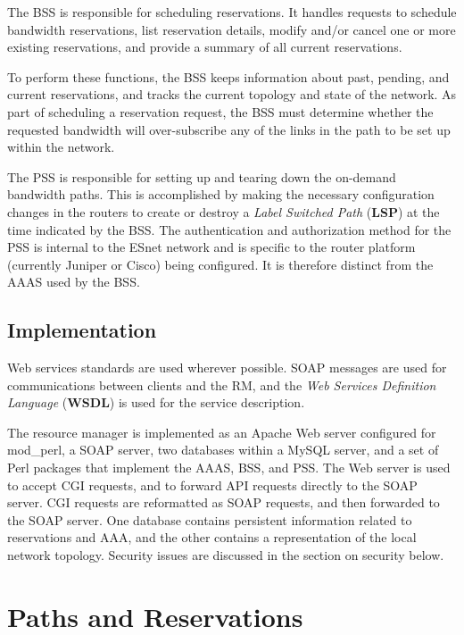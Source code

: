 \documentclass[conference]{IEEEtran}
\begin{document}
The BSS is responsible for scheduling reservations.  It handles
requests to schedule bandwidth reservations, list reservation details,
modify and/or cancel one or more existing reservations, and provide a summary
of all current reservations.

To perform these functions, the BSS keeps information about past,
pending, and current reservations, and tracks the current topology and state of
the network.  As part of scheduling a reservation request, the BSS must
determine whether the requested bandwidth will over-subscribe any of the links
in the path to be set up within the network.

The PSS is responsible for setting up and tearing down the on-demand bandwidth 
paths. This is accomplished by making the necessary configuration changes in 
the routers to create or destroy a \emph{Label Switched Path }(\textbf{LSP}) at the time
indicated by the BSS. The authentication and authorization method for the PSS 
is internal to the ESnet network and is specific to the router platform 
(currently Juniper or Cisco) being configured.  It is therefore distinct from 
the AAAS used by the BSS.

\subsection{Implementation}

Web services standards are used wherever possible.  SOAP \cite{SOAP} messages are
used for communications between clients and the RM, and 
the \emph{Web Services Definition Language} (\textbf{WSDL}) \cite{WSDL} is used for the service description.
 
The resource manager is implemented as an Apache Web server configured for
mod\_perl, a SOAP server, two databases within a MySQL server, and a set of 
Perl packages that implement the AAAS, BSS, and PSS.  The Web server is
used to accept CGI requests, and to forward API requests directly to the SOAP 
server.  CGI requests are reformatted as SOAP requests, and then forwarded to 
the SOAP server.  One database contains persistent information related to
reservations and AAA, and the other contains a representation of the local
network topology.  Security issues are discussed in the section on security
below.

\section{Paths and Reservations}
\end{document}
